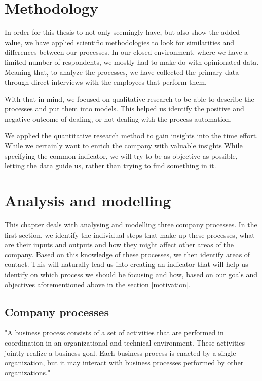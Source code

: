 \documentclass[12pt,oneside]{fithesis2}
\begin{document}
\chapter{Methodology}
In order for this thesis to not only seemingly have, but also show the added value, we have applied scientific methodologies to look for similarities and differences between our processes. In our closed environment, where we have a limited number of respondents, we mostly had to make do with opinionated data. Meaning that, to analyze the processes, we have collected the primary data through direct interviews with the employees that perform them.

With that in mind, we focused on qualitative research to be able to describe the processes and put them into models. This helped us identify the positive and negative outcome of dealing, or not dealing with the process automation. 

We applied the quantitative research method to gain insights into the time effort. While we certainly want to enrich the company with valuable insights 
While specifying the common indicator, we will try to be as objective as possible, letting the data guide us, rather than trying to find something in it.
\chapter{Analysis and modelling}
This chapter deals with analysing and modelling three company processes. In the first section, we identify the individual steps that make up these processes, what are their inputs and outputs and how they might affect other areas of the company. Based on this knowledge of these processes, we then identify areas of contact. This will naturally lead us into creating an indicator that will help us identify on which process we should be focusing and how, based on our goals and objectives aforementioned above in the section \ref{motivation}.
\section{Company processes}
"A business process consists of a set of activities that are performed in coordination in an organizational and technical environment. These activities jointly realize a business goal. Each business process is enacted by a single organization, but it may interact with business processes performed by other organizations."\cite{weske2007business}
\end{document}
